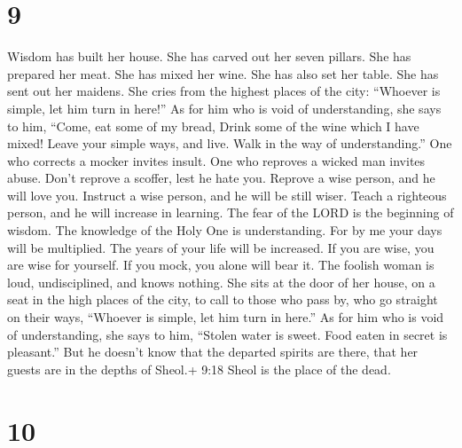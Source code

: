 \hypertarget{section-8}{%
\section{9}\label{section-8}}

 Wisdom has built her house. She has carved out her seven
pillars.  She has prepared her meat. She has mixed her wine.
She has also set her table.  She has sent out her maidens.
She cries from the highest places of the city:  ``Whoever is
simple, let him turn in here!'' As for him who is void of understanding,
she says to him,  ``Come, eat some of my bread, Drink some
of the wine which I have mixed!  Leave your simple ways, and
live. Walk in the way of understanding.''  One who corrects
a mocker invites insult. One who reproves a wicked man invites abuse.
 Don't reprove a scoffer, lest he hate you. Reprove a wise
person, and he will love you.  Instruct a wise person, and
he will be still wiser. Teach a righteous person, and he will increase
in learning.  The fear of the LORD is the beginning of
wisdom. The knowledge of the Holy One is understanding. 
For by me your days will be multiplied. The years of your life will be
increased.  If you are wise, you are wise for yourself. If
you mock, you alone will bear it.  The foolish woman is
loud, undisciplined, and knows nothing.  She sits at the
door of her house, on a seat in the high places of the city,
 to call to those who pass by, who go straight on their
ways,  ``Whoever is simple, let him turn in here.'' As for
him who is void of understanding, she says to him, 
``Stolen water is sweet. Food eaten in secret is pleasant.''
 But he doesn't know that the departed spirits are there,
that her guests are in the depths of Sheol.+ 9:18 Sheol is the place of
the dead.

\hypertarget{section-9}{%
\section{10}\label{section-9}}

